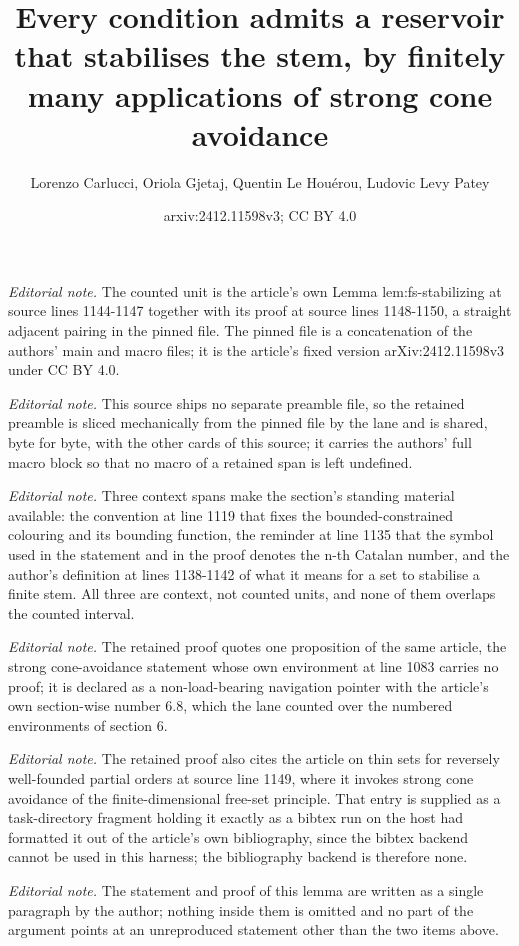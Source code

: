 \documentclass{article}
\title{Every condition admits a reservoir that stabilises the stem, by finitely many applications of strong cone avoidance}
\author{Lorenzo Carlucci, Oriola Gjetaj, Quentin Le Houérou, Ludovic Levy Patey}
\date{arxiv:2412.11598v3; CC BY 4.0}
\numberwithin{theorem}{section}
\begin{document}
\maketitle
\noindent\textit{Editorial note.} The counted unit is the article's own Lemma lem:fs-stabilizing at source lines 1144-1147 together with its proof at source lines 1148-1150, a straight adjacent pairing in the pinned file. The pinned file is a concatenation of the authors' main and macro files; it is the article's fixed version arXiv:2412.11598v3 under CC BY 4.0.\par\medskip
\noindent\textit{Editorial note.} This source ships no separate preamble file, so the retained preamble is sliced mechanically from the pinned file by the lane and is shared, byte for byte, with the other cards of this source; it carries the authors' full macro block so that no macro of a retained span is left undefined.\par\medskip
\noindent\textit{Editorial note.} Three context spans make the section's standing material available: the convention at line 1119 that fixes the bounded-constrained colouring and its bounding function, the reminder at line 1135 that the symbol used in the statement and in the proof denotes the n-th Catalan number, and the author's definition at lines 1138-1142 of what it means for a set to stabilise a finite stem. All three are context, not counted units, and none of them overlaps the counted interval.\par\medskip
\noindent\textit{Editorial note.} The retained proof quotes one proposition of the same article, the strong cone-avoidance statement whose own environment at line 1083 carries no proof; it is declared as a non-load-bearing navigation pointer with the article's own section-wise number 6.8, which the lane counted over the numbered environments of section 6.\par\medskip
\noindent\textit{Editorial note.} The retained proof also cites the article on thin sets for reversely well-founded partial orders at source line 1149, where it invokes strong cone avoidance of the finite-dimensional free-set principle. That entry is supplied as a task-directory fragment holding it exactly as a bibtex run on the host had formatted it out of the article's own bibliography, since the bibtex backend cannot be used in this harness; the bibliography backend is therefore none.\par\medskip
\noindent\textit{Editorial note.} The statement and proof of this lemma are written as a single paragraph by the author; nothing inside them is omitted and no part of the argument points at an unreproduced statement other than the two items above.\par\medskip
\end{document}
